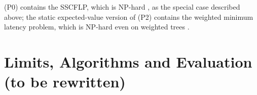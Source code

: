 \begin{remark}
(P0) contains the SSCFLP, which is NP-hard \cite{bakker2025}, as the special case described above; the static
expected-value version of (P2) contains the weighted minimum latency problem, which is NP-hard even on weighted trees
\cite{sitters2002}. 
\end{remark}

\section{Limits, Algorithms and Evaluation (to be rewritten)}\label{sec:limits}\label{sec:eval}
